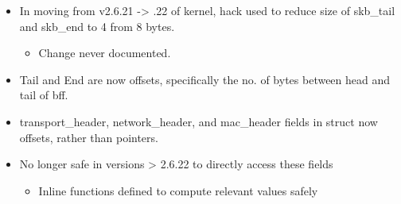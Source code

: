 \begin{itemize}
	\item In moving from v2.6.21 -> .22 of kernel, hack used to reduce size
		of skb\_tail and skb\_end to 4 from 8 bytes.
	\begin{itemize}
		\item Change never documented.
	\end{itemize}
	\item Tail and End are now offsets, specifically the no. of bytes
		between head and tail of bff.
	\item transport\_header, network\_header, and mac\_header fields in
		struct now offsets, rather than pointers.
	\item No longer safe in versions > 2.6.22 to directly access these
		fields
	\begin{itemize}
		\item Inline functions defined to compute relevant values safely
	\end{itemize}
\end{itemize}
